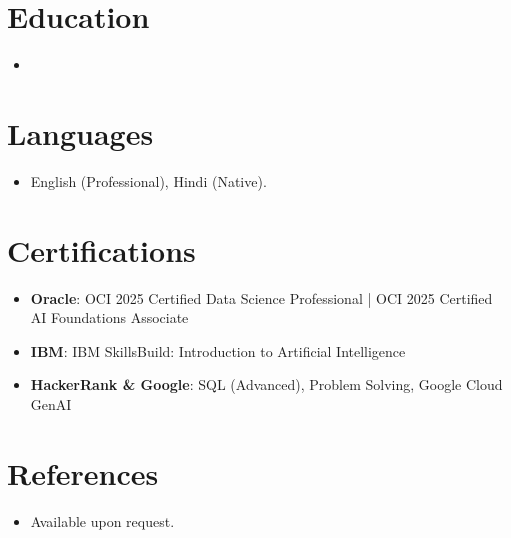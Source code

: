 \documentclass[11pt,a4paper,sans]{moderncv}
\begin{document}
\section{Education}
\vspace{1pt}
\begin{itemize}
\item{}
\end{itemize}

\section{Languages}
\vspace{1pt}
\begin{itemize}
\item English (Professional), Hindi (Native).
\end{itemize}

\section{Certifications}
\vspace{1pt}
\begin{itemize}
\item \textbf{Oracle}: OCI 2025 Certified Data Science Professional | OCI 2025 Certified AI Foundations Associate
\item \textbf{IBM}: IBM SkillsBuild: Introduction to Artificial Intelligence
\item \textbf{HackerRank \& Google}: SQL (Advanced), Problem Solving, Google Cloud GenAI
\end{itemize}

\section{References}
\vspace{1pt}
\begin{itemize}
\item Available upon request.
\end{itemize}
\end{document}
